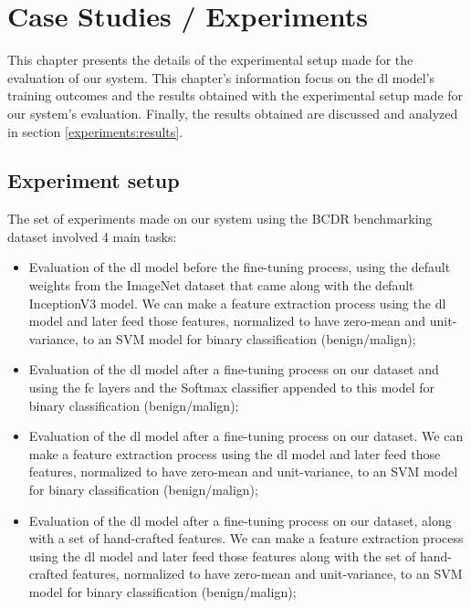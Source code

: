 \documentclass[
  twoside,
  11pt, a4paper,
  footinclude=true,
  headinclude=true,
  cleardoublepage=empty
]{scrbook}
\begin{document}
  \chapter{Case Studies / Experiments} \label{experiments}
    This chapter presents the details of the experimental setup made for the evaluation of our system. This chapter's information focus on the \gls{dl} model's training outcomes and the results obtained with the experimental setup made for our system's evaluation. Finally, the results obtained are discussed and analyzed in section \ref{experiments:results}.

    \section{Experiment setup} \label{experiments:tests}
      The set of experiments made on our system using the BCDR benchmarking dataset involved 4 main tasks:

      \begin{itemize}
        \item Evaluation of the \gls{dl} model before the fine-tuning process, using the default weights from the ImageNet dataset that came along with the default InceptionV3 model. We can make a feature extraction process using the \gls{dl} model and later feed those features, normalized to have zero-mean and unit-variance, to an SVM model for binary classification (benign/malign);
        \item Evaluation of the \gls{dl} model after a fine-tuning process on our dataset and using the \gls{fc} layers and the Softmax classifier appended to this model for binary classification (benign/malign);
        \item Evaluation of the \gls{dl} model after a fine-tuning process on our dataset. We can make a feature extraction process using the \gls{dl} model and later feed those features, normalized to have zero-mean and unit-variance, to an SVM model for binary classification (benign/malign);
        \item Evaluation of the \gls{dl} model after a fine-tuning process on our dataset, along with a set of hand-crafted features. We can make a feature extraction process using the \gls{dl} model and later feed those features along with the set of hand-crafted features, normalized to have zero-mean and unit-variance, to an SVM model for binary classification (benign/malign);
      \end{itemize}
\end{document}
